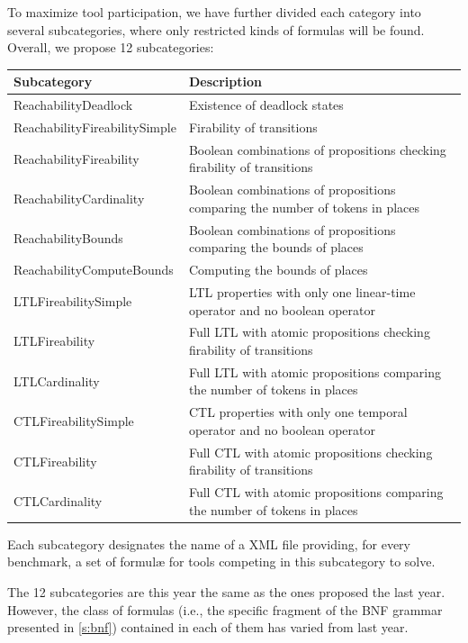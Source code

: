 \documentclass[10pt,english,a4paper]{article}
\makeatletter
\newcommand\ie               {i.e.\@\xspace}
\makeatother
\begin{document}
To maximize tool participation, we have further divided each category into
several subcategories, where only restricted kinds of formulas will be
found. Overall, we propose 12 subcategories:

\begin{center}
\begin{tabular}{ll}
\toprule
Subcategory                       & Description \\
\midrule
ReachabilityDeadlock           & Existence of deadlock states \\
ReachabilityFireabilitySimple  & Firability of transitions \\
ReachabilityFireability        & Boolean combinations of propositions checking firability of transitions \\
ReachabilityCardinality        & Boolean combinations of propositions comparing the number of tokens in places\\
ReachabilityBounds             & Boolean combinations of propositions comparing the bounds of places \\
ReachabilityComputeBounds      & Computing the bounds of places \\
\midrule
LTLFireabilitySimple           & LTL properties with only one linear-time operator and no boolean operator \\
LTLFireability                 & Full LTL with atomic propositions checking firability of transitions \\
LTLCardinality                 & Full LTL with atomic propositions comparing the number of tokens in places \\
\midrule
CTLFireabilitySimple           & CTL properties with only one temporal operator and no boolean operator \\
CTLFireability                 & Full CTL with atomic propositions checking firability of transitions \\
CTLCardinality                 & Full CTL with atomic propositions comparing the number of tokens in places \\
\bottomrule
\end{tabular}
\end{center}

Each subcategory designates the
name of a XML file providing, for every benchmark, a set of formulæ for
tools competing in this subcategory to solve.

The 12 subcategories are this year the same as the ones proposed the last
year.
However, the class of formulas (\ie, the specific fragment of the
BNF grammar presented in \cref{s:bnf}) contained in each of them has
varied from last year.
\end{document}
